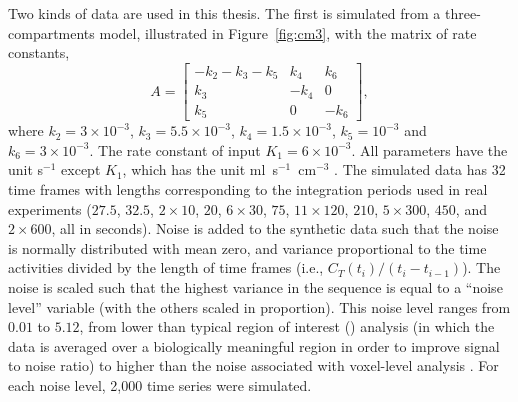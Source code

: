 Two kinds of data are used in this thesis. The first is simulated from a
three-compartments model, illustrated in Figure~\ref{fig:cm3}, with the
matrix of rate constants,
\begin{equation}
  A = \begin{bmatrix}
    - k_2 - k_3 - k_5 & k_4  & k_6 \\
    k_3               & -k_4 & 0   \\
    k_5               & 0    & -k_6
  \end{bmatrix},
\end{equation}
where $k_2 = 3 \times 10^{-3}$, $k_3 = 5.5 \times 10^{-3}$, $k_4 = 1.5 \times
10^{-3}$, $k_5 = 10^{-3}$ and $k_6 = 3 \times 10^{-3}$. The rate constant of
input $K_1 = 6\times 10^{-3}$. All parameters have the unit s$^{-1}$ except
$K_1$, which has the unit ml~s$^{-1}$~cm$^{-3}$ \cite{RLNomen}. The simulated
data has 32 time frames with lengths corresponding to the integration periods
used in real experiments ($27.5$, $32.5$, $2 \times 10$, $20$, $6 \times 30$,
$75$, $11 \times 120$, $210$, $5 \times 300$, $450$, and $2 \times 600$, all
in seconds). Noise is added to the synthetic data such that the noise is
normally distributed with mean zero, and variance proportional to the time
activities divided by the length of time frames (i.e., $C_T(t_i)/(t_i -
t_{i-1})$). The noise is scaled such that the highest variance in the
sequence is equal to a ``noise level'' variable (with the others scaled in
proportion). This noise level ranges from $0.01$ to $5.12$, from lower than
typical region of interest (\roi) analysis (in which the data is averaged
over a biologically meaningful region in order to improve signal to noise
ratio) to higher than the noise associated with voxel-level analysis
\citep{Peng:2008fx}. For each noise level, 2,000 time series were simulated.

